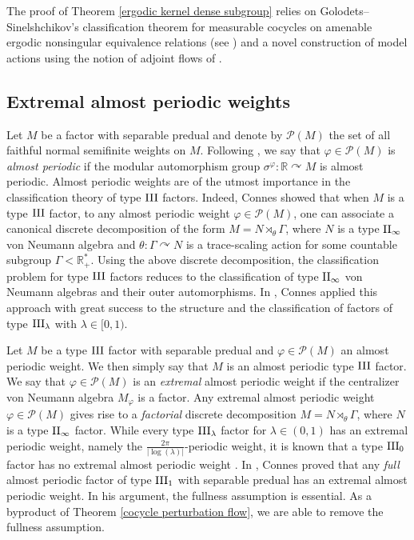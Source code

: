 \documentclass[a4paper,11pt]{amsart}
\numberwithin{equation}{section}
\theoremstyle{definition}
\newcommand{\R}{\mathbb{R}}
\newcommand{\III}{{\rm III}}
\begin{document}
The proof of Theorem \ref{ergodic kernel dense subgroup} relies on Golodets--Sinelshchikov's classification theorem for measurable cocycles on amenable ergodic nonsingular equivalence relations (see \cite[Theorem 3.1]{GS91}) and a novel construction of model actions using the notion of adjoint flows of \cite{VV22}.

\subsection{Extremal almost periodic weights}


Let $M$ be a factor with separable predual and denote by $\mathcal P(M)$ the set of all faithful normal semifinite weights on $M$. Following \cite{Co72,Co74}, we say that $\varphi \in \mathcal P(M)$ is {\em almost periodic} if  the modular automorphism group $\sigma^\varphi : \R \curvearrowright M$ is almost periodic. Almost periodic weights are of the utmost importance in the classification theory of type $\III$ factors. Indeed, Connes \cite{Co74} showed that when $M$ is a type $\III$ factor, to any almost periodic weight $\varphi \in \mathcal P(M)$, one can associate a canonical discrete decomposition of the form $M = N \rtimes_\theta \Gamma$, where $N$ is a type ${\rm II_\infty}$ von Neumann algebra and $\theta : \Gamma \curvearrowright N$ is a trace-scaling action for some countable subgroup $\Gamma < \R^*_+$. Using the above discrete decomposition, the classification problem for type $\III$ factors reduces to the classification of type ${\rm II_\infty}$ von Neumann algebras and their outer automorphisms. In \cite{Co72, Co75a, Co75b}, Connes applied this approach with great success to the structure and the classification of factors of type ${\rm III_\lambda}$ with $\lambda \in [0, 1)$.



Let $M$ be a type $\III$ factor with separable predual and $\varphi \in \mathcal P(M)$ an almost periodic weight. We then simply say that $M$ is an almost periodic type $\III$ factor. We  say that $\varphi \in \mathcal P(M)$ is an \emph{extremal} almost periodic weight if the centralizer von Neumann algebra $M_\varphi$ is a factor. Any extremal almost periodic weight $\varphi \in \mathcal P(M)$ gives rise to a {\em factorial} discrete decomposition $M = N \rtimes_\theta \Gamma$, where $N$ is a type ${\rm II_\infty}$ factor. While every type $\III_\lambda$ factor for $\lambda \in (0,1)$ has an extremal periodic weight, namely the $\frac{2\pi}{|\log(\lambda)|}$-periodic weight, it is known that a type $\III_0$ factor has no extremal almost periodic weight \cite{Co72}. In \cite{Co74}, Connes proved that  any \emph{full} almost periodic factor of type $\III_1$ with separable predual has an extremal almost periodic weight. In his argument, the fullness assumption is essential. As a byproduct of Theorem \ref{cocycle perturbation flow}, we are able to remove the fullness assumption. 
\end{document}
